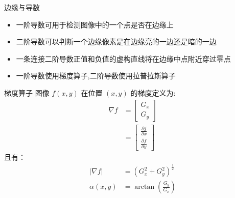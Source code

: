 \documentclass[presentation]{beamer}
\begin{document}
\begin{frame}[label={sec:org8c37b48}]{边缘与导数}
\begin{itemize}
\item 一阶导数可用于检测图像中的一个点是否在边缘上
\item 二阶导数可以判断一个边缘像素是在边缘亮的一边还是暗的一边
\item 一条连接二阶导数正值和负值的虚构直线将在边缘中点附近穿过零点
\item 一阶导数使用梯度算子,二阶导数使用拉普拉斯算子
\end{itemize}
\end{frame}

\begin{frame}[label={sec:orge532b33}]{梯度算子}
图像 \(f(x,y)\) 在位置 \((x,y)\) 的梯度定义为:
\begin{align*}
\nabla f&= \begin{bmatrix}
G_x \\
G_y
\end{bmatrix}\\
&=\begin{bmatrix}
\frac{\partial f}{\partial x} \\
\frac{\partial f}{\partial y}
\end{bmatrix}
\end{align*}
且有：
\begin{align*}
    | \nabla f | &= (G_x^2+G_y^2)^{\frac{1}{2}}\\ 
    \alpha(x,y) &= \arctan(\frac{G_y}{G_x})
\end{align*}
\end{frame}
\end{document}
